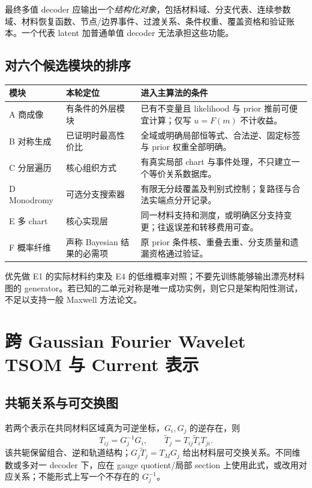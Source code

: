 最终多值 decoder 应输出一个\emph{结构化对象}，包括材料域、分支代表、连续参数域、材料恢复函数、节点/边界事件、过渡关系、条件权重、覆盖资格和验证账本。一个代表 latent 加普通单值 decoder 无法承担这些功能。

\subsection{对六个候选模块的排序}

\begin{longtable}{p{}p{}p{}}
\toprule 模块 & 本轮定位 & 进入主算法的条件\\\midrule\endhead
A 商成像 & 有条件的外层模块 & 已有不变量且 likelihood 与 prior 推前可便宜计算；仅写 $u=F(m)$ 不计收益。\\
B 对称生成 & 已证明时最高性价比 & 全域或明确局部恒等式、合法逆、固定标签与 prior 权重全部明确。\\
C 分层遍历 & 核心组织方式 & 有真实局部 chart 与事件处理，不只建立一个等价关系数据库。\\
D Monodromy & 可选分支搜索器 & 有限无分歧覆盖及判别式控制；复路径与合法实端点分开记录。\\
E 多 chart & 核心实现层 & 同一材料支持和测度，或明确区分支持变更；往返误差和转移费用可查。\\
F 概率纤维 & 声称 Bayesian 结果的必需项 & 原 prior 条件核、重叠去重、分支质量和遗漏资格通过验证。\\\bottomrule
\end{longtable}

优先做 E1 的实际材料约束及 E4 的低维概率对照；不要先训练能够输出漂亮材料图的 generator。若已知的二单元对称是唯一成功实例，则它只是架构阳性测试，不足以支持一般 Maxwell 方法论文。

\section{跨 Gaussian Fourier Wavelet TSOM 与 Current 表示}

\subsection{共轭关系与可交换图}

若两个表示在共同材料区域真为可逆坐标，$G_i,G_j$ 的逆存在，则
\begin{equation}
T_{ij}=G_j^{-1}G_i,\qquad
\widetilde T_j=T_{ij}\widetilde T_iT_{ji}.
\end{equation}
该共轭保留组合、逆和轨道结构；$G_j\widetilde T_j=T_MG_j$ 给出材料层可交换关系。不同维数或多对一 decoder 下，应在 gauge quotient/局部 section 上使用此式，或改用对应关系；不能形式上写一个不存在的 $G_j^{-1}$。

